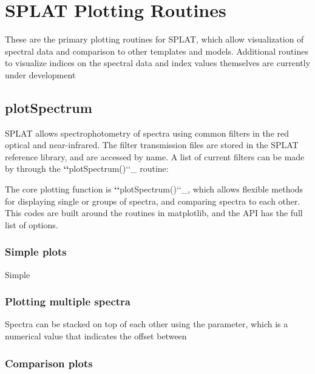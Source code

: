 \documentclass[letterpaper,10pt,english]{sphinxmanual}
\begin{document}
\section{SPLAT Plotting Routines}
\label{splat_plot::doc}\label{splat_plot:splat-plotting-routines}
These are the primary plotting routines for SPLAT, which allow visualization of spectral data and comparison to other templates and models. Additional routines to visualize indices on the spectral data and index values themselves are currently under development


\subsection{plotSpectrum}
\label{splat_plot:plotspectrum}
SPLAT allows spectrophotometry of spectra using common filters in the red optical and near-infrared. The filter transmission files are stored in the SPLAT reference library, and are accessed by name.  A list of current filters can be made by through the {\color{red}\bfseries{}{}`{}`}plotSpectrum(){}`{}`\_ routine:

The core plotting function is {\color{red}\bfseries{}{}`{}`}plotSpectrum(){}`{}`\_, which allows flexible methods for displaying single or groups of spectra, and comparing spectra to each other. This codes are built around the routines in matplotlib, and the API has the full list of options.


\subsubsection{Simple plots}
\label{splat_plot:simple-plots}
Simple


\subsubsection{Plotting multiple spectra}
\label{splat_plot:plotting-multiple-spectra}
Spectra can be stacked on top of each other using the  parameter, which is a numerical value that indicates the offset between


\subsubsection{Comparison plots}
\label{splat_plot:comparison-plots}
\end{document}
